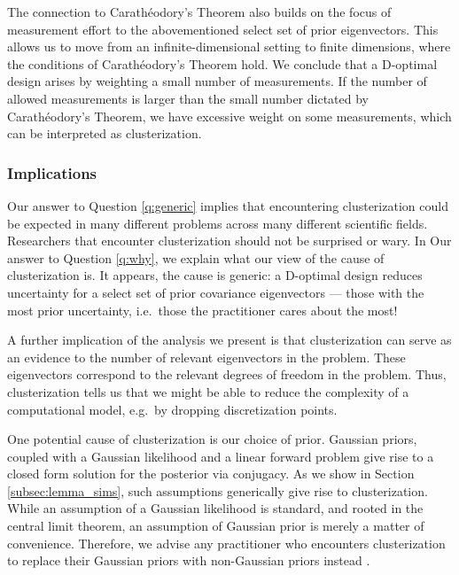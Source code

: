\documentclass[ba]{imsart}
\theoremstyle{plain}
\theoremstyle{definition}
\theoremstyle{remark}
\begin{document}
\begin{enumerate}
  The connection to Carath\'eodory's Theorem also builds on the focus
  of measurement effort to the abovementioned select set of prior
  eigenvectors. This allows us to move from an infinite-dimensional
  setting to finite dimensions, where the conditions of
  Carath\'eodory's Theorem hold. We conclude that a D-optimal design
  arises by weighting a small number of measurements. If the number of
  allowed measurements is larger than the small number dictated by
  Carath\'eodory's Theorem, we have excessive weight on some
  measurements, which can be interpreted as clusterization.
  
\end{enumerate}

\subsubsection{Implications}\label{subsub:implications}
Our answer to Question \ref{q:generic} implies that encountering
clusterization could be expected in many different problems across
many different scientific fields. Researchers that encounter
clusterization should not be surprised or wary. In Our answer to
Question \ref{q:why}, we explain what our view of the cause of
clusterization is. It appears, the cause is generic: a D-optimal
design reduces uncertainty for a select set of prior covariance
eigenvectors --- those with the most prior uncertainty, i.e.~those the
practitioner cares about the most!

A further implication of the analysis we present is that
clusterization can serve as an evidence to the number of relevant
eigenvectors in the problem. These eigenvectors correspond to the
relevant degrees of freedom in the problem. Thus, clusterization tells
us that we might be able to reduce the complexity of a computational
model, e.g.~by dropping discretization points.

One potential cause of clusterization is our choice of prior. Gaussian
priors, coupled with a Gaussian likelihood and a linear forward
problem give rise to a closed form solution for the posterior via
conjugacy. As we show in Section \ref{subsec:lemma_sims}, such
assumptions generically give rise to clusterization. While an
assumption of a Gaussian likelihood is standard, and rooted in the
central limit theorem, an assumption of Gaussian prior is merely a
matter of convenience. Therefore, we advise any practitioner who
encounters clusterization to replace their Gaussian priors with
non-Gaussian priors instead \cite{hosseini2017, hosseini2019}.
\end{document}
